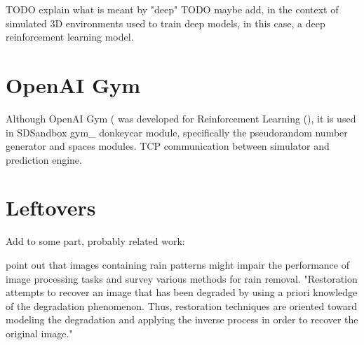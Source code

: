 TODO explain what is meant by "deep" 
TODO maybe add, in the context of simulated 3D environments used to train deep models, in this case, a deep reinforcement learning model.
\section{OpenAI Gym}
Although OpenAI Gym (\cite{brockman2016openai)} was developed for Reinforcement Learning (\cite{sutton2018reinforcement}), it is used in SDSandbox gym\_ donkeycar module, specifically the 
pseudorandom number generator and spaces modules. TCP communication between simulator and prediction engine.

\section{Leftovers}
Add to some part, probably related work:  
  
\cite{wang2019survey} point out that images containing rain patterns  might  impair  the  performance of image processing tasks and survey various methods for rain removal.  
\cite{gonzalez2018} "Restoration attempts to recover an image that has been degraded by using a priori knowledge of the degradation phenomenon. Thus, restoration techniques are oriented toward modeling the degradation and applying the inverse process in order to recover the original image."
